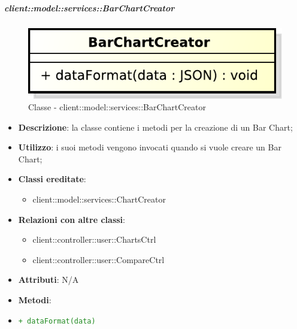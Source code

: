 		\subparagraph{client::model::services::BarChartCreator} %
		\label{subp:barchartcreator}
			\begin{figure}[htbp]
				\centering
				\centerline{\includegraphics[scale=0.7]{./images/client/classes/model/bar_chart_creator.pdf}}
				\caption{Classe - client::model::services::BarChartCreator}
			\end{figure}
			\begin{itemize}
				\item \textbf{Descrizione}: la classe contiene i metodi per la creazione di un Bar Chart;
				\item \textbf{Utilizzo}: i suoi metodi vengono invocati quando si vuole creare un Bar Chart;
				\item \textbf{Classi ereditate}:
					\begin{itemize}
						\item client::model::services::ChartCreator
					\end{itemize}
				\item \textbf{Relazioni con altre classi}:
					\begin{itemize}
						\item client::controller::user::ChartsCtrl
						\item client::controller::user::CompareCtrl
					\end{itemize}
				\item \textbf{Attributi}: N/A
				\item \textbf{Metodi}: 
					\item \textcolor{forestgreen}{\texttt{+ dataFormat(data)}}
			\end{itemize}

